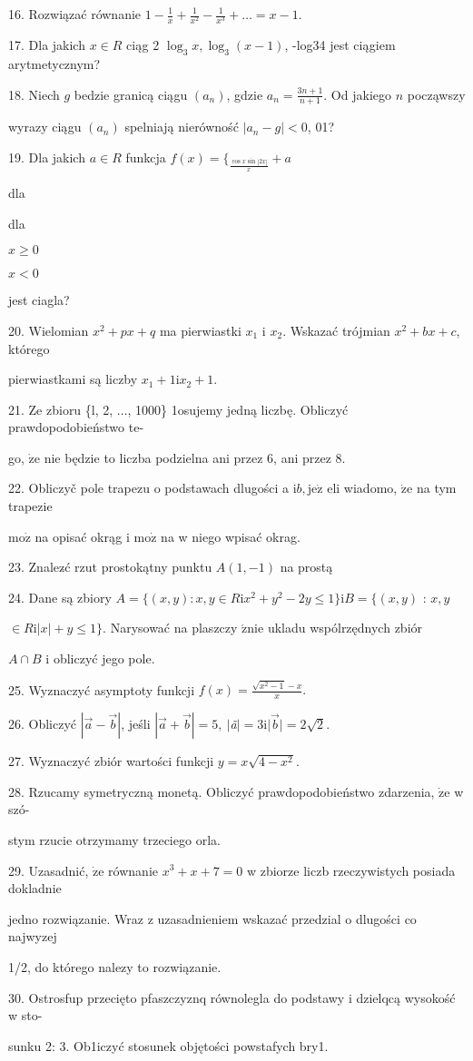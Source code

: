 \documentclass[a4paper,12pt]{article}
\begin{document}
16. Rozwiązać równanie $1-\displaystyle \frac{1}{x}+\frac{1}{x^{2}}-\frac{1}{x^{3}}+\ldots=x-1.$

17. Dla jakich $x\in R$ ciąg 2 $\log_{3}x, \log_{3}(x-1)$, -log34 jest ciągiem arytmetycznym?

18. Niech $g$ bedzie granicą ciągu $(a_{n})$, gdzie $a_{n} = \displaystyle \frac{3n+1}{n+1}$. Od jakiego $n$ począwszy

wyrazy ciągu $(a_{n})$ spelniają nierówność $|a_{n}-g|<0$, 01?

19. Dla jakich $a\in R$ funkcja $f(x)=\{_{\frac{\cos x\sin|2x|}{x}}+a$

dla

dla

$x\geq 0$

$x<0$

jest ciagla?

20. Wielomian $x^{2}+px+q$ ma pierwiastki $x_{1}$ i $x_{2}$. Wskazać trójmian $x^{2}+bx+c$, którego

pierwiastkami są liczby $x_{1}+1\mathrm{i}x_{2}+1.$

21. Ze zbioru \{l, 2, $\ldots$, 1000\} 1osujemy jedną liczbę. Obliczyć prawdopodobieństwo te-

go, $\dot{\mathrm{z}}\mathrm{e}$ nie będzie to liczba podzielna ani przez 6, ani przez 8.

22. Obliczyč pole trapezu o podstawach dlugości a $\mathrm{i}b, \mathrm{j}\mathrm{e}\dot{\mathrm{z}}$ eli wiadomo, $\dot{\mathrm{z}}\mathrm{e}$ na tym trapezie

$\mathrm{m}\mathrm{o}\dot{\mathrm{z}}$ na opisać okrąg i $\mathrm{m}\mathrm{o}\dot{\mathrm{z}}$ na w niego wpisać okrag.

23. Znalez$\acute{}$ć rzut prostokątny punktu $A(1,-1)$ na prostą 

24. Dane są zbiory $A=\{(x,y):x,y\in R\mathrm{i}x^{2}+y^{2}-2y\leq 1\} \mathrm{i} B=\{(x,y)$ : $x, y$

$\in R \mathrm{i} |x|+y \leq 1\}$. Narysować na plaszczy $\acute{\mathrm{z}}\mathrm{n}\mathrm{i}\mathrm{e}$ ukladu wspólrzędnych zbiór

$A\cap B$ i obliczyć jego pole.

25. Wyznaczyć asymptoty funkcji $f(x)=\displaystyle \frac{\sqrt{x^{2}-1}-x}{x}.$

26. Obliczyć $|\vec{a}-\vec{b}|$, jeśli $|\vec{a}+\vec{b}|=5,\ |${\it ã}$| =3\mathrm{i}|\vec{b}|=2\sqrt{2}.$

27. Wyznaczyć zbiór wartości funkcji $y=x\sqrt{4-x^{2}}.$

28. Rzucamy symetryczną monetą. Obliczyć prawdopodobieństwo zdarzenia, $\dot{\mathrm{z}}\mathrm{e}$ w szó-

stym rzucie otrzymamy trzeciego orla.

29. Uzasadnić, $\dot{\mathrm{z}}\mathrm{e}$ równanie $x^{3}+x+7=0$ w zbiorze liczb rzeczywistych posiada dokladnie

jedno rozwiązanie. Wraz z uzasadnieniem wskazać przedzial o dlugości co najwyzej

1/2, do którego nalezy to rozwiązanie.

30. Ostrosfup przecięto pfaszczyznq równolegla do podstawy i dzielqcą wysokość w sto-

sunku 2: 3. Ob1iczyć stosunek objętości powstafych bry1.
\end{document}
